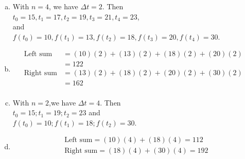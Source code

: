 \begin{enumerate}[1.]
\begin{multicols}{2}
\begin{Question}
  \end{Question}
  \begin{Solution}
    \begin{enumerate}[(a)]
    \item With $n=4$, we have $\Delta t = 2$.  Then \\
$t_0 = 15, t_1 = 17, t_2 = 19, t_3 = 21, t_4 =23$, \\
and \\
$f(t_0) = 10, f(t_1) = 13, f(t_2) = 18, f(t_3) = 20, f(t_4) = 30$. \\
\item \begin{align*}
\mbox{Left sum} &= (10)(2) + (13)(2) + (18)(2) + (20)(2) & \\
&= 122 \\
\mbox{Right sum} &= (13)(2) + (18)(2) + (20)(2) + (30)(2) \\
&= 162 \\
\end{align*}
\item  With $n = 2$,we have $\Delta t = 4$. Then \\
$t_0 = 15; t_1 = 19; t_2 = 23$ and \\
$f(t_0) = 10; f(t_1) = 18; f(t_2) = 30$.
\item
  \begin{align*}
\mbox{Left sum} = (10)(4) + (18)(4) = 112 \\
\mbox{Right sum} = (18)(4) + (30)(4) = 192 \\
  \end{align*}
    \end{enumerate}
  \end{Solution}


\end{multicols}
\end{enumerate}
